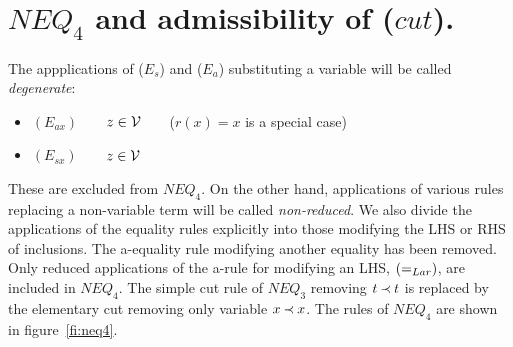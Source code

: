 %

%

%


\section{$NEQ_4$ and admissibility of ($cut$).}
%
The appplications of ($E_s$) and ($E_a$) substituting a variable 
will be called {\em degenerate}:
\begin{itemize}\MyLPar
\item $(E_{ax})$\ \ \ \
 $z\in{\cal V}$\ \ \ \ ($r(x)=x$ is a special case)
\item $(E_{sx})$\ \ \ \
 $z\in{\cal V}$
\end{itemize}
These are excluded from $NEQ_4$. On the other hand, applications of 
various rules replacing a non-variable term will be called {\em 
non-reduced}. We also divide the applications of the 
equality rules explicitly into those modifying the LHS or RHS of 
inclusions. The a-equality rule modifying another equality has been 
removed.
Only reduced applications of the a-rule for modifying an LHS, $(=_{Lar})$,
are included in $NEQ_{4}$. 
The simple cut rule of $NEQ_{3}$ removing $t\mathbin{\prec} t$ is replaced by the 
elementary cut removing only variable $x\mathbin{\prec} x$.
The rules of $NEQ_{4}$ are shown in figure~\ref{fi:neq4}.


